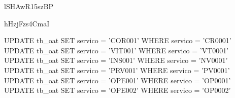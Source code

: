 lSHAwR15szBP



hHzjFzs4CmaI

UPDATE tb_oat SET servico = 'COR001' WHERE servico = 'CR0001'
UPDATE tb_oat SET servico = 'VIT001' WHERE servico = 'VT0001'
UPDATE tb_oat SET servico = 'INS001' WHERE servico = 'NV0001'
UPDATE tb_oat SET servico = 'PRV001' WHERE servico = 'PV0001'
UPDATE tb_oat SET servico = 'OPE001' WHERE servico = 'OP0001'
UPDATE tb_oat SET servico = 'OPE002' WHERE servico = 'OP0002'